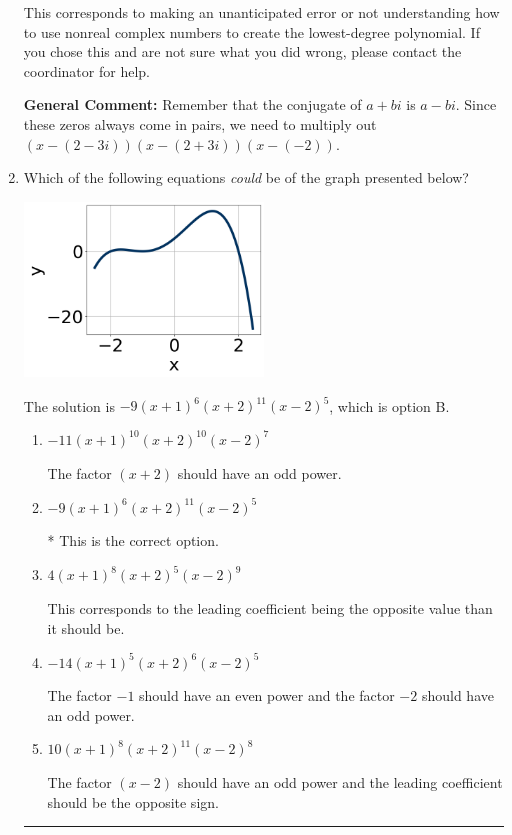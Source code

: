 \documentclass{extbook}[14pt]
\newcommand{\litem}[1]{\item #1

\rule{\textwidth}{0.4pt}}
\begin{document}
\begin{enumerate}
{\begin{enumerate}[label=\Alph*.]
This corresponds to making an unanticipated error or not understanding how to use nonreal complex numbers to create the lowest-degree polynomial. If you chose this and are not sure what you did wrong, please contact the coordinator for help.
\end{enumerate}

\textbf{General Comment:} Remember that the conjugate of $a+bi$ is $a-bi$. Since these zeros always come in pairs, we need to multiply out $(x-(2 - 3 i))(x-(2 + 3 i))(x-(-2))$.
}
\litem{
Which of the following equations \textit{could} be of the graph presented below?

\begin{center}
    \includegraphics[width=0.5\textwidth]{../Figures/polyGraphToFunctionB.png}
\end{center}


The solution is \( -9(x + 1)^{6} (x + 2)^{11} (x - 2)^{5} \), which is option B.\begin{enumerate}[label=\Alph*.]
\item \( -11(x + 1)^{10} (x + 2)^{10} (x - 2)^{7} \)

The factor $(x + 2)$ should have an odd power.
\item \( -9(x + 1)^{6} (x + 2)^{11} (x - 2)^{5} \)

* This is the correct option.
\item \( 4(x + 1)^{8} (x + 2)^{5} (x - 2)^{9} \)

This corresponds to the leading coefficient being the opposite value than it should be.
\item \( -14(x + 1)^{5} (x + 2)^{6} (x - 2)^{5} \)

The factor $-1$ should have an even power and the factor $-2$ should have an odd power.
\item \( 10(x + 1)^{8} (x + 2)^{11} (x - 2)^{8} \)

The factor $(x - 2)$ should have an odd power and the leading coefficient should be the opposite sign.
\end{enumerate}

}
\end{enumerate}
\end{document}
